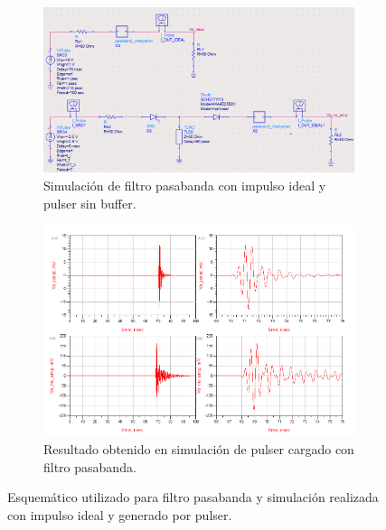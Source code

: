 \begin{figure}[t]
    \centering
    \begin{subfigure}[b]{0.45\textwidth}
        \centering
        \includegraphics[width=\textwidth]{images/passband_pulser_sim_no_amp.png}
        \caption{Simulación de filtro pasabanda con impulso ideal y pulser sin
        buffer.}
        \label{fig:passband_pulser_sim_no_amp}
    \end{subfigure}
    \hfill
    \begin{subfigure}[b]{0.45\textwidth}
        \centering
        \includegraphics[width=\textwidth]{images/passband_pulser_sim_no_amp_results.png}
        \caption{Resultado obtenido en simulación de pulser cargado con filtro
        pasabanda.}
        \label{fig:passband_pulser_sim_no_amp_results}
    \end{subfigure}
    \caption{Esquemático utilizado para filtro pasabanda y simulación realizada
    con impulso ideal y generado por pulser.}
    \label{fig:passband_cheby_and_with_pulser}
\end{figure}

